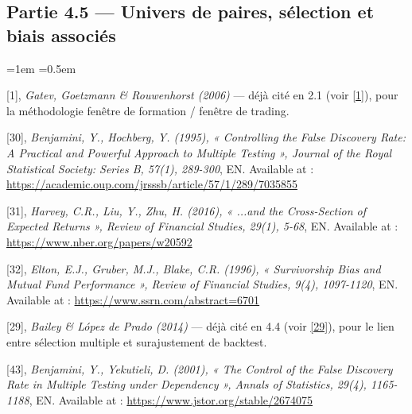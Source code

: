\documentclass{article}
\begin{document}
\subsection*{Partie 4.5 --- Univers de paires, sélection et biais associés}
\begin{list}{}{\leftmargin=1em \itemsep=0.5em}
\item \hypertarget{ref1}{} [1], \textit{Gatev, Goetzmann \& Rouwenhorst (2006)} --- déjà cité en 2.1 (voir \hyperlink{ref1}{[1]}), pour la méthodologie fenêtre de formation / fenêtre de trading.
\item \hypertarget{ref30}{} [30], \textit{Benjamini, Y., Hochberg, Y. (1995), « Controlling the False Discovery Rate: A Practical and Powerful Approach to Multiple Testing », Journal of the Royal Statistical Society: Series B, 57(1), 289-300}, EN. Available at : \url{https://academic.oup.com/jrsssb/article/57/1/289/7035855}
\item \hypertarget{ref31}{} [31], \textit{Harvey, C.R., Liu, Y., Zhu, H. (2016), « ...and the Cross-Section of Expected Returns », Review of Financial Studies, 29(1), 5-68}, EN. Available at : \url{https://www.nber.org/papers/w20592}
\item \hypertarget{ref32}{} [32], \textit{Elton, E.J., Gruber, M.J., Blake, C.R. (1996), « Survivorship Bias and Mutual Fund Performance », Review of Financial Studies, 9(4), 1097-1120}, EN. Available at : \url{https://www.ssrn.com/abstract=6701}
\item \hypertarget{ref29}{} [29], \textit{Bailey \& López de Prado (2014)} --- déjà cité en 4.4 (voir \hyperlink{ref29}{[29]}), pour le lien entre sélection multiple et surajustement de backtest.
\item \hypertarget{ref43}{} [43], \textit{Benjamini, Y., Yekutieli, D. (2001), « The Control of the False Discovery Rate in Multiple Testing under Dependency », Annals of Statistics, 29(4), 1165-1188}, EN. Available at : \url{https://www.jstor.org/stable/2674075}
\end{list}
\end{document}
